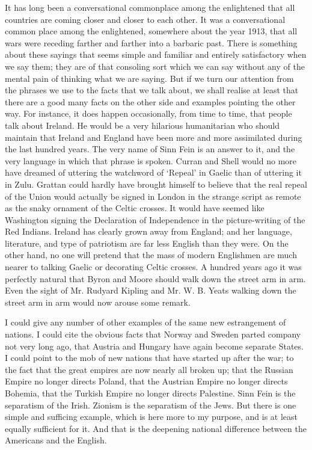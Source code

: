 \documentclass{book}
\begin{document}
It has long been a conversational commonplace among the enlightened that all countries are coming closer and closer to each other. It was a conversational common place among the enlightened, somewhere about the year 1913, that all wars were receding farther and farther into a barbaric past. There is something about these sayings that seems simple and familiar and entirely satisfactory when we say them; they are of that consoling sort which we can say without any of the mental pain of thinking what we are saying. But if we turn our attention from the phrases we use to the facts that we talk about, we shall realise at least that there are a good many facts on the other side and examples pointing the other way. For instance, it does happen occasionally, from time to time, that people talk about Ireland. He would be a very hilarious humanitarian who should maintain that Ireland and England have been more and more assimilated during the last hundred years. The very name of Sinn Fein is an answer to it, and the very language in which that phrase is spoken. Curran and Shell would no more have dreamed of uttering the watchword of ‘Repeal’ in Gaelic than of uttering it in Zulu. Grattan could hardly have brought himself to believe that the real repeal of the Union would actually be signed in London in the strange script as remote as the snaky ornament of the Celtic crosses. It would have seemed like Washington signing the Declaration of Independence in the picture-writing of the Red Indians. Ireland has clearly grown away from England; and her language, literature, and type of patriotism are far less English than they were. On the other hand, no one will pretend that the mass of modern Englishmen are much nearer to talking Gaelic or decorating Celtic crosses. A hundred years ago it was perfectly natural that Byron and Moore should walk down the street arm in arm. Even the sight of Mr. Rudyard Kipling and Mr. W. B. Yeats walking down the street arm in arm would now arouse some remark.

I could give any number of other examples of the same new estrangement of nations. I could cite the obvious facts that Norway and Sweden parted company not very long ago, that Austria and Hungary have again become separate States. I could point to the mob of new nations that have started up after the war; to the fact that the great empires are now nearly all broken up; that the Russian Empire no longer directs Poland, that the Austrian Empire no longer directs Bohemia, that the Turkish Empire no longer directs Palestine. Sinn Fein is the separatism of the Irish. Zionism is the separatism of the Jews. But there is one simple and sufficing example, which is here more to my purpose, and is at least equally sufficient for it. And that is the deepening national difference between the Americans and the English.
\end{document}
